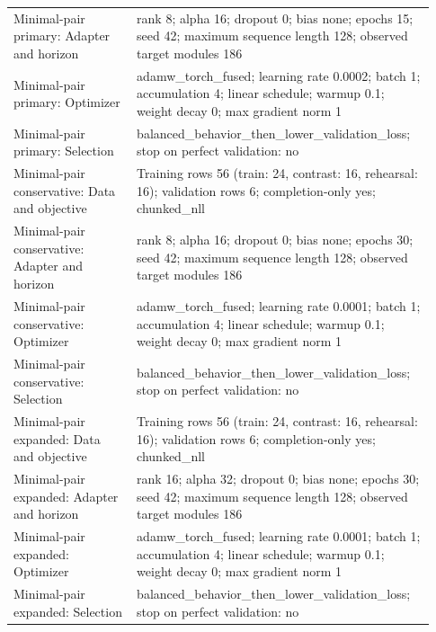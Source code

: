 \begin{longtable}{p{0.28\linewidth}p{0.65\linewidth}}
Minimal-pair primary: Adapter and horizon & rank 8; alpha 16; dropout 0; bias none; epochs 15; seed 42; maximum sequence length 128; observed target modules 186 \\
Minimal-pair primary: Optimizer & adamw\_torch\_fused; learning rate 0.0002; batch 1; accumulation 4; linear schedule; warmup 0.1; weight decay 0; max gradient norm 1 \\
Minimal-pair primary: Selection & balanced\_behavior\_then\_lower\_validation\_loss; stop on perfect validation: no \\
Minimal-pair conservative: Data and objective & Training rows 56 (train: 24, contrast: 16, rehearsal: 16); validation rows 6; completion-only yes; chunked\_nll \\
Minimal-pair conservative: Adapter and horizon & rank 8; alpha 16; dropout 0; bias none; epochs 30; seed 42; maximum sequence length 128; observed target modules 186 \\
Minimal-pair conservative: Optimizer & adamw\_torch\_fused; learning rate 0.0001; batch 1; accumulation 4; linear schedule; warmup 0.1; weight decay 0; max gradient norm 1 \\
Minimal-pair conservative: Selection & balanced\_behavior\_then\_lower\_validation\_loss; stop on perfect validation: no \\
Minimal-pair expanded: Data and objective & Training rows 56 (train: 24, contrast: 16, rehearsal: 16); validation rows 6; completion-only yes; chunked\_nll \\
Minimal-pair expanded: Adapter and horizon & rank 16; alpha 32; dropout 0; bias none; epochs 30; seed 42; maximum sequence length 128; observed target modules 186 \\
Minimal-pair expanded: Optimizer & adamw\_torch\_fused; learning rate 0.0001; batch 1; accumulation 4; linear schedule; warmup 0.1; weight decay 0; max gradient norm 1 \\
Minimal-pair expanded: Selection & balanced\_behavior\_then\_lower\_validation\_loss; stop on perfect validation: no \\
\bottomrule\end{longtable}\endgroup
